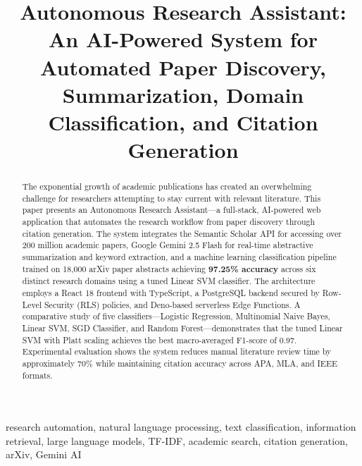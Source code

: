 \documentclass[conference]{IEEEtran}
\begin{document}
\title{Autonomous Research Assistant: An AI-Powered System for Automated Paper Discovery, Summarization, Domain Classification, and Citation Generation}

\author{
}

\maketitle

\begin{abstract}
The exponential growth of academic publications has created an overwhelming challenge for researchers attempting to stay current with relevant literature. This paper presents an Autonomous Research Assistant---a full-stack, AI-powered web application that automates the research workflow from paper discovery through citation generation. The system integrates the Semantic Scholar API for accessing over 200 million academic papers, Google Gemini 2.5 Flash for real-time abstractive summarization and keyword extraction, and a machine learning classification pipeline trained on 18,000 arXiv paper abstracts achieving \textbf{97.25\% accuracy} across six distinct research domains using a tuned Linear SVM classifier. The architecture employs a React 18 frontend with TypeScript, a PostgreSQL backend secured by Row-Level Security (RLS) policies, and Deno-based serverless Edge Functions. A comparative study of five classifiers---Logistic Regression, Multinomial Naive Bayes, Linear SVM, SGD Classifier, and Random Forest---demonstrates that the tuned Linear SVM with Platt scaling achieves the best macro-averaged F1-score of 0.97. Experimental evaluation shows the system reduces manual literature review time by approximately 70\% while maintaining citation accuracy across APA, MLA, and IEEE formats.
\end{abstract}

\begin{IEEEkeywords}
research automation, natural language processing, text classification, information retrieval, large language models, TF-IDF, academic search, citation generation, arXiv, Gemini AI
\end{IEEEkeywords}
\end{document}
